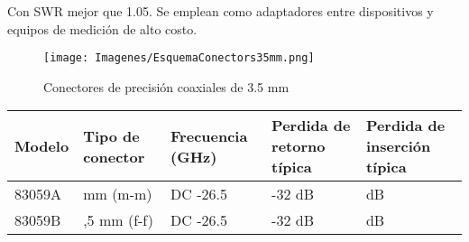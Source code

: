 Con SWR mejor que 1.05. Se emplean como adaptadores entre dispositivos y equipos de medición de alto costo. 	

\begin{figure}
	\centering
	\begin{minipage}{15.656cm}				
		\texttt{[image: Imagenes/EsquemaConectors35mm.png]}
		\caption{Conectores de precisión coaxiales de 3.5 mm}
		\label{Fig:ConectoresPrecision35mm}
	\end{minipage}
\end{figure}

\begin{center}
	\tablefirsthead{}
	\tablehead{}
	\tabletail{}
	\tablelasttail{}
	\begin{supertabular}{|m{1.2659999cm}|m{2.873cm}|m{2.9329998cm}|m{3.136cm}|m{4.4570003cm}|}
		\hline
		\centering Modelo &
		\centering Tipo de conector &
		\centering Frecuencia (GHz) &
		\centering Perdida de retorno típica &
		\centering Perdida de inserción típica\\\hline
		\centering 83059A &
		 mm (m-m) &
		\centering DC -26.5 &
		\centering {}-32 dB  &
		 dB \\ \hline
		\centering 83059B &
		,5 mm (f-f) &
		\centering DC -26.5 &
		\centering {}-32 dB &
		 dB\\\hline
	\end{supertabular}
\end{center}


